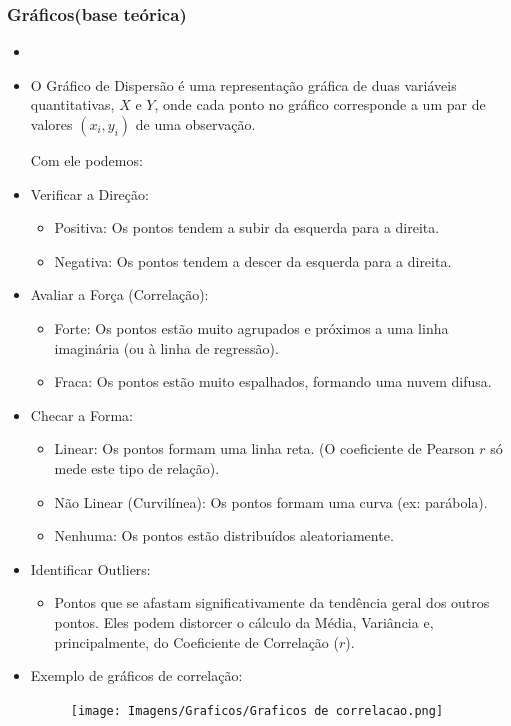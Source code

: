 \documentclass[a4paper,11pt]{article}
\begin{document}
\subsubsection*{Gráficos(base teórica)} 

\begin{itemize}
\item[]

    \item O Gráfico de Dispersão é uma representação gráfica de duas variáveis quantitativas, $X$ e $Y$, onde cada ponto no gráfico corresponde a um par de valores $(x_i, y_i)$ de uma observação.

    Com ele podemos:
    \item Verificar a Direção:
    \begin{itemize}
        \item Positiva: Os pontos tendem a subir da esquerda para a direita.
        \item Negativa: Os pontos tendem a descer da esquerda para a direita.
    \end{itemize}
    
    \item Avaliar a Força (Correlação):
    \begin{itemize}
        \item Forte: Os pontos estão muito agrupados e próximos a uma linha imaginária (ou à linha de regressão).
        \item Fraca: Os pontos estão muito espalhados, formando uma nuvem difusa.
    \end{itemize}
    
    \item Checar a Forma:
    \begin{itemize}
        \item Linear: Os pontos formam uma linha reta. (O coeficiente de Pearson $r$ só mede este tipo de relação).
        \item Não Linear (Curvilínea): Os pontos formam uma curva (ex: parábola).
        \item Nenhuma: Os pontos estão distribuídos aleatoriamente.
    \end{itemize}    
    
    \item Identificar Outliers:
    \begin{itemize}
        \item Pontos que se afastam significativamente da tendência geral dos outros pontos. Eles podem distorcer o cálculo da Média, Variância e, principalmente, do Coeficiente de Correlação ($r$).
    \end{itemize}

    \item Exemplo de gráficos de correlação:

    \begin{figure}[H] 
    \centering 
    \texttt{[image: Imagens/Graficos/Graficos de correlacao.png]} 
\end{figure}

    
\end{itemize}
\end{document}
